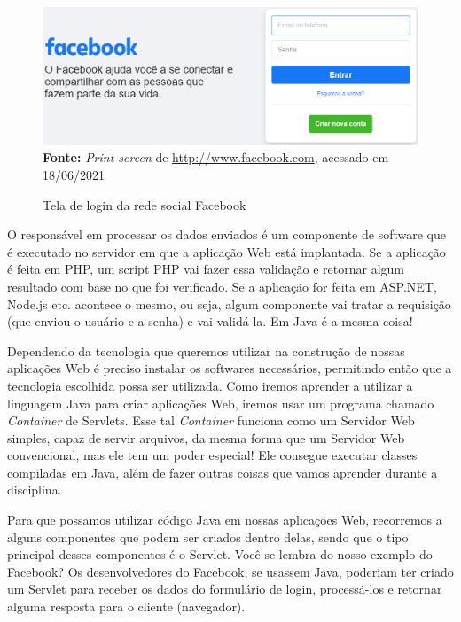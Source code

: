 \FloatBarrier
\begin{figure}[!htbp]
    \centering
    \caption{Tela de login da rede social Facebook}
    \includegraphics[scale=0.38]{imagens/cap01LoginFacebook}
    \\\textbf{Fonte:} \textit{Print screen} de \url{http://www.facebook.com}, acessado em 18/06/2021
    \label{fig:cap01LoginFacebook}
\end{figure}
\FloatBarrier

O responsável em processar os dados enviados é um componente de software que é executado no servidor em que a aplicação Web está implantada. Se a aplicação é feita em PHP, um script PHP vai fazer essa validação e retornar algum resultado com base no que foi verificado. Se a aplicação for feita em ASP.NET, Node.js etc. acontece o mesmo, ou seja, algum componente vai tratar a requisição (que enviou o usuário e a senha) e vai validá-la. Em Java é a mesma coisa!

Dependendo da tecnologia que queremos utilizar na construção de nossas aplicações Web é preciso instalar os softwares necessários, permitindo então que a tecnologia escolhida possa ser utilizada. Como iremos aprender a utilizar a linguagem Java para criar aplicações Web, iremos usar um programa chamado \textit{Container} de Servlets. Esse tal \textit{Container} funciona como um Servidor Web simples, capaz de servir arquivos, da mesma forma que um Servidor Web convencional, mas ele tem um poder especial! Ele consegue executar classes compiladas em Java, além de fazer outras coisas que vamos aprender durante a disciplina.

Para que possamos utilizar código Java em nossas aplicações Web, recorremos a alguns componentes que podem ser criados dentro delas, sendo que o tipo principal desses componentes é o Servlet. Você se lembra do nosso exemplo do Facebook? Os desenvolvedores do Facebook, se usassem Java, poderiam ter criado um Servlet para receber os dados do formulário de login, processá-los e retornar alguma resposta para o cliente (navegador).

